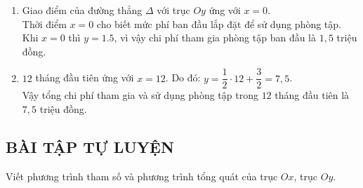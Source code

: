 \begin{vd}
{\begin{enumerate}
			\begin{eqnarray*}
				& & \dfrac{x-0}{7-0}=\dfrac{y-1.5}{5-1.5} \Leftrightarrow \dfrac{x}{7} = \dfrac{y-1.5}{3.5}\\
				& \Leftrightarrow & \dfrac{x}{7}=\dfrac{2y-3}{7} \Leftrightarrow x=2y-3\\
				& \Leftrightarrow & y = \dfrac{1}{2}x+\dfrac{3}{2}.
			\end{eqnarray*}
			\item Giao điểm của đường thẳng $\Delta$ với trục $O y$ ứng với $x=0$. \\
			Thời điểm $x=0$ cho biết mức phí ban đầu lắp đặt để sử dụng phòng tập. \\
			Khi $x=0$ thì $y=1.5$, vì vậy chi phí tham gia phòng tập ban đầu là $1{,}5$ triệu đồng.
			\item $12$ tháng đầu tiên ứng với $x=12$. Do đó: $y=\dfrac{1}{2}\cdot12+\dfrac{3}{2}=7{,}5$.\\
			Vậy tổng chi phí tham gia và sử dụng phòng tập trong $12$ tháng đầu tiên là $7{,}5$ triệu đồng.
		\end{enumerate}
	}
\end{vd}

\subsection{BÀI TẬP TỰ LUYỆN}

\begin{baitap}
	Viết phương trình tham số và phương trình tổng quát của trục $Ox$, trục $Oy$.
\end{baitap}


